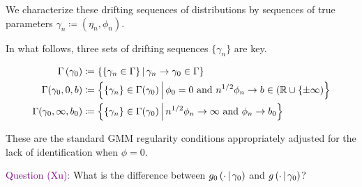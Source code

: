 \documentclass[11pt]{article}
\newcommand{\purple}[1]{\textcolor{purple}{#1}}
\newcommand*{\R}{\mathbb{R}}
\newcommand{\mvert}[1][\middle]{\ensuremath{\,#1\vert\,}}
\begin{document}
We characterize these drifting sequences of distributions by sequences of true parameters $\gamma_n \coloneqq
(\eta_n, \phi_n)$.

In what follows, three sets of drifting sequences $\lbrace \gamma_n \rbrace$ are key. 

\begin{align}
    \Gamma\left(\gamma_0\right) &\coloneqq \left\lbrace \left\lbrace \gamma_n \in \Gamma \right\rbrace \mvert
        \gamma_n \to \gamma_0 \in \Gamma \right\rbrace\\ 
    \Gamma(\gamma_0, 0, b) &\coloneqq \left\lbrace \lbrace \gamma_n \rbrace \in \Gamma(\gamma_0) \mvert \phi_0 =
        0\ \text{and}\ n^{1/2} \phi_n \to b \in (\R \cup \lbrace \pm \infty) \right\rbrace \\
    \Gamma(\gamma_0, \infty, b_0) &\coloneqq \left\lbrace \lbrace \gamma_n \rbrace \in \Gamma (\gamma_0) \mvert
        n^{1/2} \phi_n \to \infty\ \text{and}\ \phi_n \to b_0 \right\rbrace 
\end{align}


These are the standard GMM regularity conditions appropriately adjusted for the lack of identification when $\phi
=0$.

\purple{Question (Xu):}
What is the difference between $g_0\left(\cdot \mvert \gamma_0\right)$ and $g\left(\cdot \mvert \gamma_0\right)$?
\end{document}
